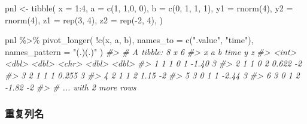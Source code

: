 \documentclass[
]{book}
\newenvironment{Shaded}{\begin{snugshade}}{\end{snugshade}}
\newcommand{\AttributeTok}[1]{\textcolor[rgb]{0.77,0.63,0.00}{#1}}
\newcommand{\CommentTok}[1]{\textcolor[rgb]{0.56,0.35,0.01}{\textit{#1}}}
\newcommand{\DecValTok}[1]{\textcolor[rgb]{0.00,0.00,0.81}{#1}}
\newcommand{\FunctionTok}[1]{\textcolor[rgb]{0.00,0.00,0.00}{#1}}
\newcommand{\NormalTok}[1]{#1}
\newcommand{\OtherTok}[1]{\textcolor[rgb]{0.56,0.35,0.01}{#1}}
\newcommand{\SpecialCharTok}[1]{\textcolor[rgb]{0.00,0.00,0.00}{#1}}
\newcommand{\StringTok}[1]{\textcolor[rgb]{0.31,0.60,0.02}{#1}}
\begin{document}
\begin{Shaded}
\begin{Highlighting}[]
\NormalTok{pnl }\OtherTok{\textless{}{-}} \FunctionTok{tibble}\NormalTok{(}
  \AttributeTok{x =} \DecValTok{1}\SpecialCharTok{:}\DecValTok{4}\NormalTok{,}
  \AttributeTok{a =} \FunctionTok{c}\NormalTok{(}\DecValTok{1}\NormalTok{, }\DecValTok{1}\NormalTok{,}\DecValTok{0}\NormalTok{, }\DecValTok{0}\NormalTok{),}
  \AttributeTok{b =} \FunctionTok{c}\NormalTok{(}\DecValTok{0}\NormalTok{, }\DecValTok{1}\NormalTok{, }\DecValTok{1}\NormalTok{, }\DecValTok{1}\NormalTok{),}
  \AttributeTok{y1 =} \FunctionTok{rnorm}\NormalTok{(}\DecValTok{4}\NormalTok{),}
  \AttributeTok{y2 =} \FunctionTok{rnorm}\NormalTok{(}\DecValTok{4}\NormalTok{),}
  \AttributeTok{z1 =} \FunctionTok{rep}\NormalTok{(}\DecValTok{3}\NormalTok{, }\DecValTok{4}\NormalTok{),}
  \AttributeTok{z2 =} \FunctionTok{rep}\NormalTok{(}\SpecialCharTok{{-}}\DecValTok{2}\NormalTok{, }\DecValTok{4}\NormalTok{),}
\NormalTok{)}

\NormalTok{pnl }\SpecialCharTok{\%\textgreater{}\%} 
  \FunctionTok{pivot\_longer}\NormalTok{(}
    \SpecialCharTok{!}\FunctionTok{c}\NormalTok{(x, a, b), }
    \AttributeTok{names\_to =} \FunctionTok{c}\NormalTok{(}\StringTok{".value"}\NormalTok{, }\StringTok{"time"}\NormalTok{), }
    \AttributeTok{names\_pattern =} \StringTok{"(.)(.)"}
\NormalTok{  )}
\CommentTok{\#\textgreater{} \# A tibble: 8 x 6}
\CommentTok{\#\textgreater{}       x     a     b time       y     z}
\CommentTok{\#\textgreater{}   \textless{}int\textgreater{} \textless{}dbl\textgreater{} \textless{}dbl\textgreater{} \textless{}chr\textgreater{}  \textless{}dbl\textgreater{} \textless{}dbl\textgreater{}}
\CommentTok{\#\textgreater{} 1     1     1     0 1     {-}1.40      3}
\CommentTok{\#\textgreater{} 2     1     1     0 2      0.622    {-}2}
\CommentTok{\#\textgreater{} 3     2     1     1 1      0.255     3}
\CommentTok{\#\textgreater{} 4     2     1     1 2      1.15     {-}2}
\CommentTok{\#\textgreater{} 5     3     0     1 1     {-}2.44      3}
\CommentTok{\#\textgreater{} 6     3     0     1 2     {-}1.82     {-}2}
\CommentTok{\#\textgreater{} \# ... with 2 more rows}
\end{Highlighting}
\end{Shaded}

\hypertarget{ux91cdux590dux5217ux540d}{%
\subsubsection{重复列名}\label{ux91cdux590dux5217ux540d}}
\end{document}
